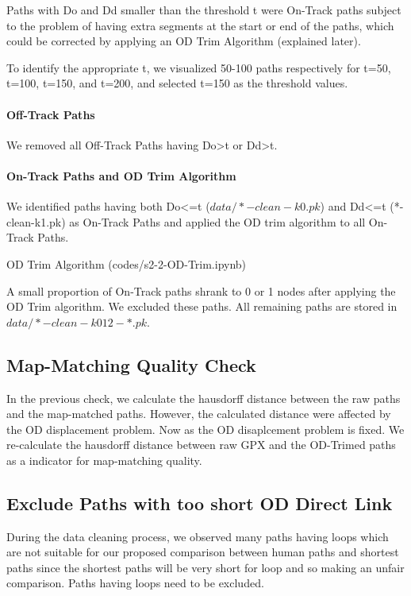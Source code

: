 \documentclass{article}
\begin{document}
Paths with Do and Dd smaller than the threshold t were On-Track paths subject to the problem of having extra segments at the start or end of the paths, which could be corrected by applying an OD Trim Algorithm (explained later). 

To identify the appropriate t, we visualized 50-100 paths respectively for t=50, t=100, t=150, and t=200, and selected t=150 as the threshold values. 

\paragraph{Off-Track Paths}
We removed all Off-Track Paths having Do>t or Dd>t. 

\paragraph{On-Track Paths and OD Trim Algorithm}
We identified paths having both Do<=t ($data/*-clean-k0.pk$)  and Dd<=t (*-clean-k1.pk) as On-Track Paths and applied the OD trim algorithm to all On-Track Paths. 

OD Trim Algorithm (codes/s2-2-OD-Trim.ipynb)


A small proportion of On-Track paths shrank to 0 or 1 nodes after applying the OD Trim algorithm. We excluded these paths. All remaining paths are stored in $data/*-clean-k012-*.pk$.


\subsection{Map-Matching Quality Check}
In the previous check, we calculate the hausdorff distance between the raw paths and the map-matched paths. However, the calculated distance were affected by the OD displacement problem. Now as the OD disaplcement problem is fixed. We re-calculate the hausdorff distance between raw GPX and the OD-Trimed paths as a indicator for map-matching quality. 


\subsection{Exclude Paths with too short OD Direct Link}
During the data cleaning process, we observed many paths having loops which are not suitable for our proposed comparison between human paths and shortest paths since the shortest paths will be very short for loop and so making an unfair comparison. Paths having loops need to be excluded. 
\end{document}
